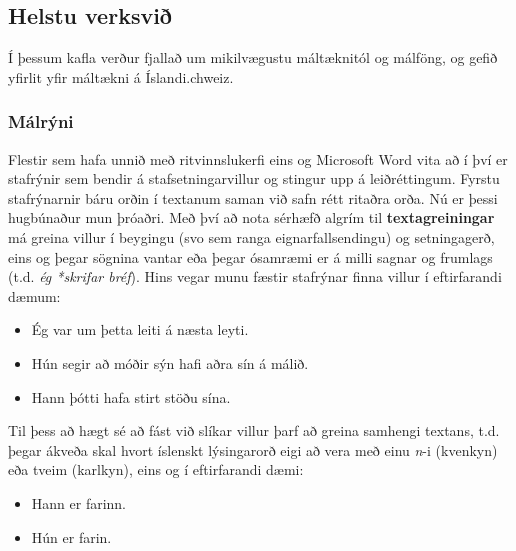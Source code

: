 \documentclass{../../metanetpaper}
\begin{document}
\begin{multicols}{2}
\subsection{Helstu verksvið} 

Í þessum kafla verður fjallað um mikilvægustu máltæknitól og málföng, og gefið yfirlit yfir máltækni á Íslandi.chweiz. 

\subsubsection{Málrýni}

Flestir sem hafa unnið með ritvinnslukerfi eins og Microsoft Word vita að í því er stafrýnir sem bendir á stafsetningarvillur og stingur upp á leiðréttingum. Fyrstu stafrýnarnir báru orðin í textanum saman við safn rétt ritaðra orða. Nú er þessi hugbúnaður mun þróaðri. Með því að nota sérhæfð algrím til \textbf{textagreiningar} má greina villur í beygingu (svo sem ranga eignarfallsendingu) og setningagerð, eins og þegar sögnina vantar eða þegar ósamræmi er á milli sagnar og frumlags (t.d. \textit{ég *skrifar bréf}). Hins vegar munu fæstir stafrýnar finna villur í eftirfarandi dæmum:

\begin{itemize}
\item Ég var um þetta leiti á næsta leyti.
\item Hún segir að móðir sýn hafi aðra sín á málið.
\item Hann þótti hafa stirt stöðu sína.
\end{itemize}

Til þess að hægt sé að fást við slíkar villur þarf að greina samhengi textans, t.d. þegar ákveða skal hvort íslenskt lýsingarorð eigi að vera með einu \textit{n}-i (kvenkyn) eða tveim (karlkyn), eins og í eftirfarandi dæmi:

\begin{itemize}
\item Hann er farinn.
\item Hún er farin.
\end{itemize}


\end{multicols}
\end{document}
